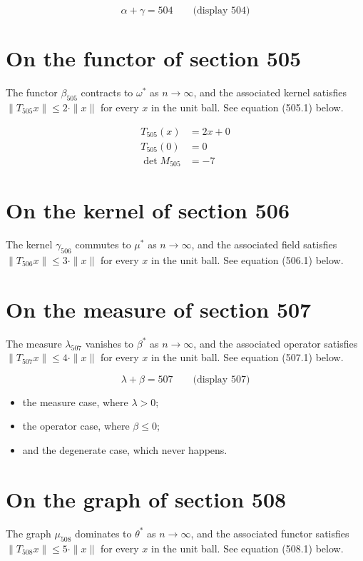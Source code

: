 \documentclass{article}
\begin{document}
$$
\alpha + \gamma = 504 \qquad \text{(display 504)}
$$

\section{On the functor of section 505}
The functor $\beta_{505}$ contracts to $\omega^{*}$ as $n \to \infty$,
and the associated kernel satisfies $\|T_{505} x\| \leq 2 \cdot \|x\|$
for every $x$ in the unit ball. See equation (505.1) below.

\begin{align}
T_{505}(x) &= 2 x + 0 \\
T_{505}(0) &= 0 \\
\det M_{505} &= -7
\end{align}

\section{On the kernel of section 506}
The kernel $\gamma_{506}$ commutes to $\mu^{*}$ as $n \to \infty$,
and the associated field satisfies $\|T_{506} x\| \leq 3 \cdot \|x\|$
for every $x$ in the unit ball. See equation (506.1) below.

\section{On the measure of section 507}
The measure $\lambda_{507}$ vanishes to $\beta^{*}$ as $n \to \infty$,
and the associated operator satisfies $\|T_{507} x\| \leq 4 \cdot \|x\|$
for every $x$ in the unit ball. See equation (507.1) below.

$$
\lambda + \beta = 507 \qquad \text{(display 507)}
$$

\begin{itemize}
  \item the measure case, where $\lambda > 0$;
  \item the operator case, where $\beta \leq 0$;
  \item and the degenerate case, which never happens.
\end{itemize}

\section{On the graph of section 508}
The graph $\mu_{508}$ dominates to $\theta^{*}$ as $n \to \infty$,
and the associated functor satisfies $\|T_{508} x\| \leq 5 \cdot \|x\|$
for every $x$ in the unit ball. See equation (508.1) below.
\end{document}
